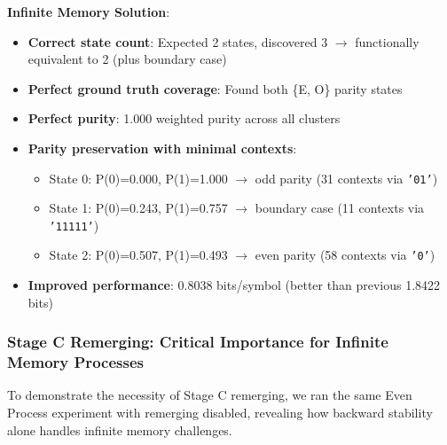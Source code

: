 \documentclass[11pt]{article}
\begin{document}
\begin{resultbox}
\textbf{Infinite Memory Solution}:
\begin{itemize}
\item \textbf{Correct state count}: Expected 2 states, discovered 3 $\rightarrow$ functionally equivalent to 2 (plus boundary case)
\item \textbf{Perfect ground truth coverage}: Found both \{E, O\} parity states
\item \textbf{Perfect purity}: 1.000 weighted purity across all clusters
\item \textbf{Parity preservation with minimal contexts}:
  \begin{itemize}
  \item State 0: P(0)=0.000, P(1)=1.000 $\rightarrow$ odd parity (31 contexts via \texttt{'01'})
  \item State 1: P(0)=0.243, P(1)=0.757 $\rightarrow$ boundary case (11 contexts via \texttt{'11111'})
  \item State 2: P(0)=0.507, P(1)=0.493 $\rightarrow$ even parity (58 contexts via \texttt{'0'})
  \end{itemize}
\item \textbf{Improved performance}: 0.8038 bits/symbol (better than previous 1.8422 bits)
\end{itemize}
\end{resultbox}

\subsubsection{Stage C Remerging: Critical Importance for Infinite Memory Processes}

To demonstrate the necessity of Stage C remerging, we ran the same Even Process experiment with remerging disabled, revealing how backward stability alone handles infinite memory challenges.
\end{document}
